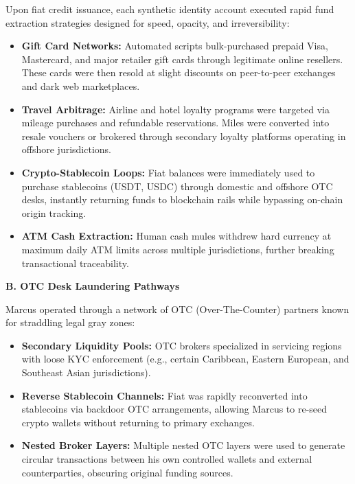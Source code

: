 Upon fiat credit issuance, each synthetic identity account executed rapid fund extraction strategies designed for speed, opacity, and irreversibility:

\begin{itemize}
    \item \textbf{Gift Card Networks:}  
    Automated scripts bulk-purchased prepaid Visa, Mastercard, and major retailer gift cards through legitimate online resellers. These cards were then resold at slight discounts on peer-to-peer exchanges and dark web marketplaces.

    \item \textbf{Travel Arbitrage:}  
    Airline and hotel loyalty programs were targeted via mileage purchases and refundable reservations. Miles were converted into resale vouchers or brokered through secondary loyalty platforms operating in offshore jurisdictions.

    \item \textbf{Crypto-Stablecoin Loops:}  
    Fiat balances were immediately used to purchase stablecoins (USDT, USDC) through domestic and offshore OTC desks, instantly returning funds to blockchain rails while bypassing on-chain origin tracking.

    \item \textbf{ATM Cash Extraction:}  
    Human cash mules withdrew hard currency at maximum daily ATM limits across multiple jurisdictions, further breaking transactional traceability.
\end{itemize}

\medskip

\textbf{B. OTC Desk Laundering Pathways}

Marcus operated through a network of OTC (Over-The-Counter) partners known for straddling legal gray zones:

\begin{itemize}
    \item \textbf{Secondary Liquidity Pools:}  
    OTC brokers specialized in servicing regions with loose KYC enforcement (e.g., certain Caribbean, Eastern European, and Southeast Asian jurisdictions).

    \item \textbf{Reverse Stablecoin Channels:}  
    Fiat was rapidly reconverted into stablecoins via backdoor OTC arrangements, allowing Marcus to re-seed crypto wallets without returning to primary exchanges.

    \item \textbf{Nested Broker Layers:}  
    Multiple nested OTC layers were used to generate circular transactions between his own controlled wallets and external counterparties, obscuring original funding sources.
\end{itemize}

